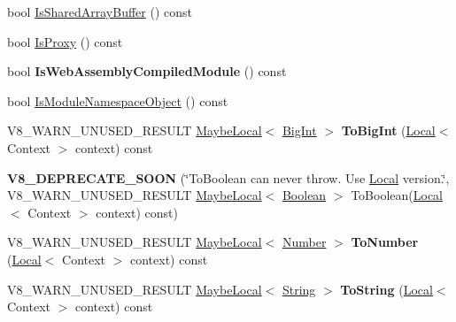 \begin{DoxyCompactItemize}
bool \mbox{\hyperlink{classv8_1_1Value_a1d7d90fe704feab89dcbdc383ab298b2}{Is\+Shared\+Array\+Buffer}} () const
\item 
bool \mbox{\hyperlink{classv8_1_1Value_a3c0ad01f2ca4ac050ef8214785848918}{Is\+Proxy}} () const
\item 
\mbox{\label{classv8_1_1Value_afca9fc3c0149433e8df15317d2b15590}} 
bool {\bfseries Is\+Web\+Assembly\+Compiled\+Module} () const
\item 
bool \mbox{\hyperlink{classv8_1_1Value_aa6c9cb065da30b0b58b929ecaa80a1ab}{Is\+Module\+Namespace\+Object}} () const
\item 
\mbox{\label{classv8_1_1Value_ad148cfd0e9e58ef94c4ee2150a092fb0}} 
V8\+\_\+\+W\+A\+R\+N\+\_\+\+U\+N\+U\+S\+E\+D\+\_\+\+R\+E\+S\+U\+LT \mbox{\hyperlink{classv8_1_1MaybeLocal}{Maybe\+Local}}$<$ \mbox{\hyperlink{classv8_1_1BigInt}{Big\+Int}} $>$ {\bfseries To\+Big\+Int} (\mbox{\hyperlink{classv8_1_1Local}{Local}}$<$ Context $>$ context) const
\item 
\mbox{\label{classv8_1_1Value_add02ab2b2738b3d4426da92dd92274d0}} 
{\bfseries V8\+\_\+\+D\+E\+P\+R\+E\+C\+A\+T\+E\+\_\+\+S\+O\+ON} (\char`\"{}To\+Boolean can never throw. Use \mbox{\hyperlink{classv8_1_1Local}{Local}} version.\char`\"{}, V8\+\_\+\+W\+A\+R\+N\+\_\+\+U\+N\+U\+S\+E\+D\+\_\+\+R\+E\+S\+U\+LT \mbox{\hyperlink{classv8_1_1MaybeLocal}{Maybe\+Local}}$<$ \mbox{\hyperlink{classv8_1_1Boolean}{Boolean}} $>$ To\+Boolean(\mbox{\hyperlink{classv8_1_1Local}{Local}}$<$ Context $>$ context) const)
\item 
\mbox{\label{classv8_1_1Value_a750b6ca8a0a5bda092094560b98cbd0f}} 
V8\+\_\+\+W\+A\+R\+N\+\_\+\+U\+N\+U\+S\+E\+D\+\_\+\+R\+E\+S\+U\+LT \mbox{\hyperlink{classv8_1_1MaybeLocal}{Maybe\+Local}}$<$ \mbox{\hyperlink{classv8_1_1Number}{Number}} $>$ {\bfseries To\+Number} (\mbox{\hyperlink{classv8_1_1Local}{Local}}$<$ Context $>$ context) const
\item 
\mbox{\label{classv8_1_1Value_a891e7235d17f2b3abdaeb69f0a54ef4f}} 
V8\+\_\+\+W\+A\+R\+N\+\_\+\+U\+N\+U\+S\+E\+D\+\_\+\+R\+E\+S\+U\+LT \mbox{\hyperlink{classv8_1_1MaybeLocal}{Maybe\+Local}}$<$ \mbox{\hyperlink{classv8_1_1String}{String}} $>$ {\bfseries To\+String} (\mbox{\hyperlink{classv8_1_1Local}{Local}}$<$ Context $>$ context) const

\end{DoxyCompactItemize}
